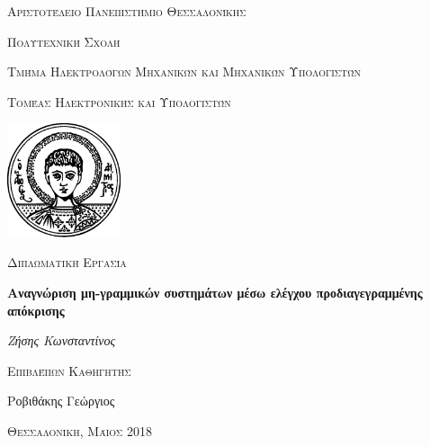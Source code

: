 \documentclass[12pt]{report}
\begin{document}

\begin{titlepage}
	\centering
	{\scshape\Large Αριστοτέλειο Πανεπιστήμιο Θεσσαλονίκης \par}
	{\scshape\Large Πολυτεχνική Σχολή \par}
	{\scshape\Large Τμήμα Ηλεκτρολόγων Μηχανικών και Μηχανικών Υπολογιστών \par}
	{\scshape\Large Τομέας Ηλεκτρονικής και Υπολογιστών \par}
	\vspace{0.5cm}
	\includegraphics[width=0.25\textwidth]{LogoAUTHblack} \par
	\vspace{1cm}
	{\scshape\Large Διπλωματική Εργασία \par}
	\vspace{0.3cm}
	{\huge\bfseries Αναγνώριση μη-γραμμικών συστημάτων μέσω ελέγχου προδιαγεγραμμένης απόκρισης \par}
	\vspace{2cm}
	{\Large\itshape Ζήσης Κωνσταντίνος \par}
	\vfill
	{\scshape\large Επιβλέπων Καθηγητής \par}
	{\large Ροβιθάκης Γεώργιος}
	\vfill
	{\scshape\large Θεσσαλονίκη, Μάιος 2018\par}
\end{titlepage}

\digital
\else
\fi

\pagestyle{fancy}
\fancyhf{}
\fancyhead[L]{\textit{ \nouppercase{\leftmark}} }
\fancyhead[R]{\textit{ \nouppercase{\rightmark}} }
\digital
	\fancyfoot[C]{\thepage}
\else
	\fancyfoot[LE,RO]{\thepage}
\fi
\end{document}
